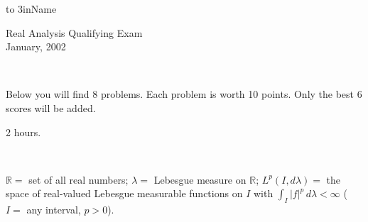 \documentclass[12pt]{article}
\newcommand{\D}{\mathbb{D} }
\newcommand{\C}{\mathbb{C} }
\newcommand{\R}{\mathbb{R} }
\begin{document}
\vspace*{-1in}
\hfill\hbox to 3in{Name\hrulefill}
\vspace{1in}
\begin{center}{\large Real Analysis Qualifying Exam}
\\\bigskip
{\large January, 2002}
\end{center}

\

  Below you will find 8 problems.
Each problem is worth 10 points. Only the
best 6 scores will be added.

 2 hours.

\

 $\R =$ set of all real numbers;
$\lambda =$ Lebesgue measure on $\R$;
$L^p(I,d\lambda)=$ the space of real-valued Lebesgue
measurable functions on $I$ with $\int_I|f|^p\,d\lambda<\infty$ ($I=$ any interval,
$p>0$).

\
\end{document}
